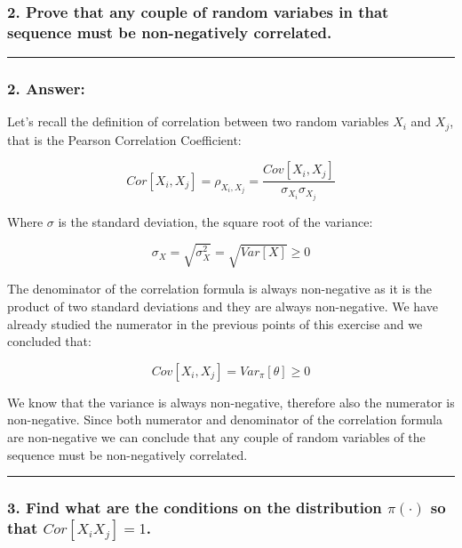 \documentclass[
]{article}
\begin{document}
\hypertarget{prove-that-any-couple-of-random-variabes-in-that-sequence-must-be-non-negatively-correlated.}{%
\subsubsection{2. Prove that any couple of random variabes in that
sequence must be non-negatively
correlated.}\label{prove-that-any-couple-of-random-variabes-in-that-sequence-must-be-non-negatively-correlated.}}

\begin{center}\rule{0.5\linewidth}{0.5pt}\end{center}

\hypertarget{answer-11}{%
\subsubsection{2. Answer:}\label{answer-11}}

Let's recall the definition of correlation between two random variables
\(X_i\) and \(X_j\), that is the Pearson Correlation Coefficient:

\[
Cor[X_i, X_j] =
\rho_{X_i,X_j} =
\frac{Cov[X_i, X_j]}{\sigma_{X_i}\sigma_{X_j}}
\]

Where \(\sigma\) is the standard deviation, the square root of the
variance:

\[
\sigma_X =
\sqrt{\sigma^2_X}=\sqrt{Var[X]} \ge 0
\]

The denominator of the correlation formula is always non-negative as it
is the product of two standard deviations and they are always
non-negative. We have already studied the numerator in the previous
points of this exercise and we concluded that:

\[
Cov[X_i, X_j] =
Var_\pi[\theta] \ge 0
\]

We know that the variance is always non-negative, therefore also the
numerator is non-negative. Since both numerator and denominator of the
correlation formula are non-negative we can conclude that any couple of
random variables of the sequence must be non-negatively correlated.

\begin{center}\rule{0.5\linewidth}{0.5pt}\end{center}

\hypertarget{find-what-are-the-conditions-on-the-distribution-picdot-so-that-corx_i-x_j1.}{%
\subsubsection{\texorpdfstring{3. Find what are the conditions on the
distribution \(\pi(\cdot)\) so that
\(Cor[X_i X_j]=1\).}{3. Find what are the conditions on the distribution \textbackslash pi(\textbackslash cdot) so that Cor{[}X\_i X\_j{]}=1.}}\label{find-what-are-the-conditions-on-the-distribution-picdot-so-that-corx_i-x_j1.}}
\end{document}
